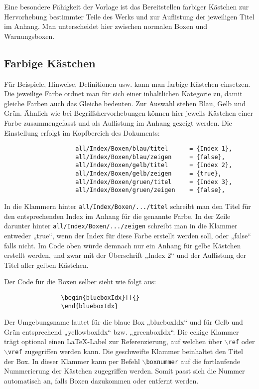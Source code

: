 			Eine besondere Fähigkeit der Vorlage ist das Bereitstellen farbiger Kästchen zur Hervorhebung bestimmter Teile des Werks und zur Auflistung der jeweiligen Titel im Anhang. Man unterscheidet hier zwischen normalen Boxen und Warnungsboxen.

			\subsection{Farbige Kästchen}

				Für Beispiele, Hinweise, Definitionen usw. kann man farbige Kästchen einsetzen. Die jeweilige Farbe ordnet man für sich einer inhaltlichen Kategorie zu, damit gleiche Farben auch das Gleiche bedeuten. Zur Auswahl stehen Blau, Gelb und Grün. Ähnlich wie bei Begriffshervorhebungen können hier jeweils Kästchen einer Farbe zusammengefasst und als Auflistung im Anhang gezeigt werden. Die Einstellung erfolgt im Kopfbereich des Dokuments:

				\begin{verbatim}
					all/Index/Boxen/blau/titel      = {Index 1},
					all/Index/Boxen/blau/zeigen     = {false},
					all/Index/Boxen/gelb/titel      = {Index 2},
					all/Index/Boxen/gelb/zeigen     = {true},
					all/Index/Boxen/gruen/titel     = {Index 3},
					all/Index/Boxen/gruen/zeigen    = {false},
				\end{verbatim}

				In die Klammern hinter \texttt{all/Index/Boxen/.../titel} schreibt man den Titel für den entsprechenden Index im Anhang für die genannte Farbe. In der Zeile darunter hinter \texttt{all/Index/Boxen/.../zeigen} schreibt man in die Klammer entweder „true“, wenn der Index für diese Farbe erstellt werden soll, oder „false“ falls nicht. Im Code oben würde demnach nur ein Anhang für gelbe Kästchen erstellt werden, und zwar mit der Überschrift „Index 2“ und der Auflistung der Titel aller gelben Kästchen.

				Der Code für die Boxen selber sieht wie folgt aus:

				\begin{verbatim}
				\begin{blueboxIdx}[]{}
				\end{blueboxIdx}
				\end{verbatim}

				Der Umgebungsname lautet für die blaue Box „blueboxIdx“ und für Gelb und Grün entsprechend „yellowboxIdx“ bzw. „greenboxIdx“. Die eckige Klammer trägt optional einen \LaTeX{}-Label zur Referenzierung, auf welchen über \texttt{$\backslash$ref} oder \texttt{$\backslash$vref} zugegriffen werden kann. Die geschweifte Klammer beinhaltet den Titel der Box. In dieser Klammer kann per Befehl \texttt{$\backslash$boxnummer} auf die fortlaufende Nummerierung der Kästchen zugegriffen werden. Somit passt sich die Nummer automatisch an, falls Boxen dazukommen oder entfernt werden.

